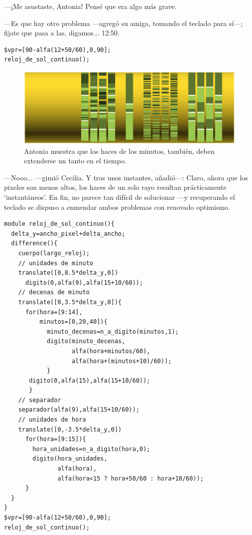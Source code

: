 ---¡Me asustaste, Antonia! Pensé que era algo más grave.

---Es que hay otro problema ---agregó su amiga, tomando el teclado
para sí---; fijate que pasa a las, digamos... 12:50.

\begin{lstlisting}
$vpr=[90-alfa(12+50/60),0,90];
reloj_de_sol_continuo();
\end{lstlisting}%


\begin{figure}[ht]
  \centering
  \includegraphics[width=.99\textwidth]{imagenes/minutos-cortos}  
  \caption{Antonia muestra que los haces de los minutos, también,
    deben extenderse un tanto en el tiempo.}
  \label{fig:minutos-cortos}
\end{figure}


---Nooo... ---gimió Cecilia. Y tras unos instantes,
a\-ña\-\mbox{dió---:} Claro, ahora que los pixeles son menos altos,
los haces de un solo rayo resultan prácticamente `instantáneos'. En
fin, no parece tan difícil de solucionar ---y recuperando el teclado
se dispuso a enmendar ambos problemas con renovado optimismo.

\begin{lstlisting}
module reloj_de_sol_continuo(){
  delta_y=ancho_pixel+delta_ancho;
  difference(){
    cuerpo(largo_reloj);    
    // unidades de minuto
    translate([0,8.5*delta_y,0])
      digito(0,alfa(9),alfa(15+10/60));  
    // decenas de minuto
    translate([0,3.5*delta_y,0]){
      for(hora=[9:14],
          minutos=[0,20,40]){
            minuto_decenas=n_a_digito(minutos,1);
            digito(minuto_decenas,
                   alfa(hora+minutos/60),
                   alfa(hora+(minutos+10)/60));
            }
       digito(0,alfa(15),alfa(15+10/60));
       }            
    // separador
    separador(alfa(9),alfa(15+10/60));  
    // unidades de hora
    translate([0,-3.5*delta_y,0])
      for(hora=[9:15]){
        hora_unidades=n_a_digito(hora,0);
        digito(hora_unidades,
               alfa(hora),
               alfa(hora<15 ? hora+50/60 : hora+10/60));
      }        
  }  
}
$vpr=[90-alfa(12+50/60),0,90];
reloj_de_sol_continuo();
\end{lstlisting}%


